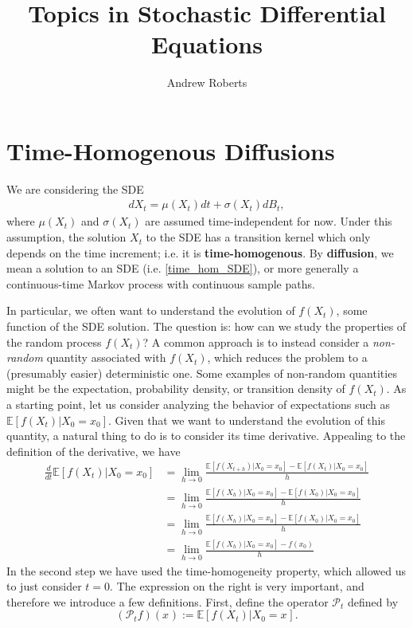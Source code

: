 \documentclass[12pt]{article}
\title{Topics in Stochastic Differential Equations}
\author{Andrew Roberts}
\newcommand{\E}{\mathbb{E}}
\newcommand{\state}[1][t]{X_{#1}}
\newcommand{\stateValue}[1][t]{x_{#1}}
\newcommand{\BM}[1][t]{B_{#1}} %
\newcommand{\op}[1][t]{\mathcal{P}_{#1}} %
\begin{document}
\maketitle
\tableofcontents
\newpage

\section{Time-Homogenous Diffusions}
We are considering the SDE 
\begin{align}
 d\state = \mu(\state) dt + \sigma(\state) d\BM, \label{time_hom_SDE}
\end{align}
where $\mu(\state)$ and $\sigma(\state)$ are assumed time-independent for now. Under this assumption, the solution $\state$ to the SDE has a transition 
kernel which only depends on the time increment; i.e. it is \textbf{time-homogenous}. By \textbf{diffusion}, we mean a solution to an SDE 
(i.e. \ref{time_hom_SDE}), or more generally a continuous-time Markov process with continuous sample paths. 

In particular, we often want to understand the evolution of $f(\state)$, some function of the SDE solution. The question is: how can we study the properties 
of the random process $f(\state)$? A common approach is to instead consider a \textit{non-random} quantity associated with $f(\state)$, which reduces the 
problem to a (presumably easier) deterministic one. Some examples of non-random quantities might be the expectation, probability density, or transition 
density of $f(\state)$. As a starting point, let us consider analyzing the behavior of expectations such as $\E[f(\state) | \state[0] = \stateValue[0]]$. 
Given that we want to understand the evolution of this quantity, a natural thing to do is to consider its time derivative. Appealing to the definition of the 
derivative, we have 
\begin{align*}
\frac{d}{dt} \E[f(\state) | \state[0] = \stateValue[0]] 
&= \lim_{h \to 0} \frac{\E[f(\state[t+h]) | \state[0] = \stateValue[0]] - \E[f(\state[t]) | \state[0] = \stateValue[0]]}{h} \\
&=  \lim_{h \to 0} \frac{\E[f(\state[h]) | \state[0] = \stateValue[0]] - \E[f(\state[0]) | \state[0] = \stateValue[0]]}{h} \\
&=  \lim_{h \to 0} \frac{\E[f(\state[h]) | \state[0] = \stateValue[0]] - \E[f(\state[0]) | \state[0] = \stateValue[0]]}{h} \\
&=  \lim_{h \to 0} \frac{\E[f(\state[h]) | \state[0] = \stateValue[0]] - f(\stateValue[0])}{h}
\end{align*}
In the second step we have used the time-homogeneity property, which allowed us to just consider $t = 0$. The expression on the right is very important, 
and therefore we introduce a few definitions. First, define the operator $\op$ defined by 
\[
(\op f)(\stateValue[]) := \E[f(\state) | \state[0] = \stateValue[]].
\]
\end{document}
